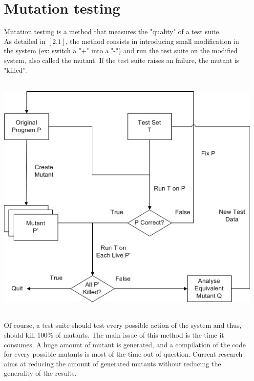 \documentclass[a4paper]{report}
\begin{document}
\section*{Mutation testing}
Mutation testing is a method that measures the "quality" of a test suite.\\
As detailed in $[2.1]$, the method consists in introducing small modification in the system (ex: switch a "+" into a "-") and run the test suite on the modified system, also called the mutant. If the test suite raises an failure, the mutant is "killed".\\
\newline
$ $\\
\centerline{
  \includegraphics[scale=0.5]{img/mutation.jpg}
}
$ $\\
\newline
Of course, a test suite should test every possible action of the system and thus, should kill 100\% of mutants.
The main issue of this method is the time it consumes. A huge amount of mutant is generated, and a compilation of the code for every possible mutants is most of the time out of question. Current research aims at reducing the amount of generated mutants without reducing the generality of the results.\\ 
\end{document}
